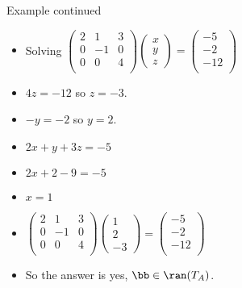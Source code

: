 \documentclass{beamer}
\begin{document}

\begin{frame}{Example continued}

\begin{itemize}
\item Solving
$
\begin{pmatrix}
2 & 1 &  3 \\
0 & -1 & 0 \\
0 & 0 &  4 \\
\end{pmatrix}
\begin{pmatrix}
x \\ y \\ z
\end{pmatrix}
=
\begin{pmatrix}
 -5 \\
 -2 \\
 -12 \\
\end{pmatrix}
$
\item $4z=-12$ so $z=-3$.
\item $-y = -2$ so $y=2$.
\item $2x +y +3z = -5$
\item $2x + 2  -9 = -5$
\item $x=1$
\item
$
\begin{pmatrix}
2 & 1 &  3 \\
0 & -1 & 0 \\
0 & 0 &  4 \\
\end{pmatrix}
\begin{pmatrix}
1 \\ 2 \\ -3
\end{pmatrix}
=
\begin{pmatrix}
 -5 \\
 -2 \\
 -12 \\
\end{pmatrix}
$
\item So the answer is yes, $\bb\in\ran(T_A)$.
\end{itemize}

\end{frame}

\end{document}
